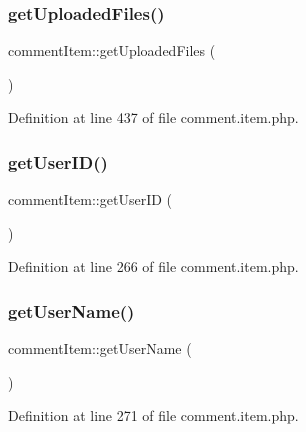 \subsubsection{\texorpdfstring{get\+Uploaded\+Files()}{getUploadedFiles()}}
{\footnotesize\ttfamily comment\+Item\+::get\+Uploaded\+Files (\begin{DoxyParamCaption}{ }\end{DoxyParamCaption})}



Definition at line 437 of file comment.\+item.\+php.

\hypertarget{classcommentItem_a5c793e6542e731da5d465c35c77b42fd}{}\label{classcommentItem_a5c793e6542e731da5d465c35c77b42fd} 
\subsubsection{\texorpdfstring{get\+User\+I\+D()}{getUserID()}}
{\footnotesize\ttfamily comment\+Item\+::get\+User\+ID (\begin{DoxyParamCaption}{ }\end{DoxyParamCaption})}



Definition at line 266 of file comment.\+item.\+php.

\hypertarget{classcommentItem_a1c35032d37e80ad5018a02787f0091fe}{}\label{classcommentItem_a1c35032d37e80ad5018a02787f0091fe} 
\subsubsection{\texorpdfstring{get\+User\+Name()}{getUserName()}}
{\footnotesize\ttfamily comment\+Item\+::get\+User\+Name (\begin{DoxyParamCaption}{ }\end{DoxyParamCaption})}



Definition at line 271 of file comment.\+item.\+php.

\hypertarget{classcommentItem_abe1774ffe4e8c0f5c14822c5698433da}{}\label{classcommentItem_abe1774ffe4e8c0f5c14822c5698433da} 
